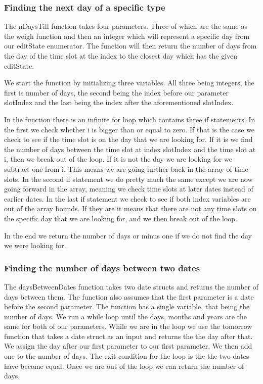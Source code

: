 \subsubsection{Finding the next day of a specific type}
The nDaysTill function takes four parameters. Three of which are the same as the weigh function and then an integer which will represent a specific day from our editState enumerator. The function will then return the number of days from the day of the time slot at the index to the closest day which has the given editState. 

We start the function by initializing three variables. All three being integers, the first is number of days, the second being the index before our parameter slotIndex and the last being the index after the aforementioned slotIndex. 

In the function there is an infinite for loop which contains three if statements. In the first we check whether i is bigger than or equal to zero. If that is the case we check to see if the time slot is on the day that we are looking for. If it is we find the number of days between the time slot at index slotIndex and the time slot at i, then we break out of the loop. If it is not the day we are looking for we subtract one from i. This means we are going further back in the array of time slots. In the second if statement we do pretty much the same except we are now going forward in the array, meaning we check time slots at later dates instead of earlier dates. In the last if statement we check to see if both index variables are out of the array bounds. If they are it means that there are not any time slots on the specific day that we are looking for, and we then break out of the loop.

In the end we return the number of days or minus one if we do not find the day we were looking for.

\subsubsection{Finding the number of days between two dates}
The daysBetweenDates function takes two date structs and returns the number of days between them. The function also assumes that the first parameter is a date before the second parameter. The function has a single variable, that being the number of days. We run a while loop until the days, months and years are the same for both of our parameters. While we are in the loop we use the tomorrow function that takes a date struct as an input and returns the the day after that. We assign the day after our first parameter to our first parameter. We then add one to the number of days. The exit condition for the loop is the the two dates have become equal. Once we are out of the loop we can return the number of days. 

